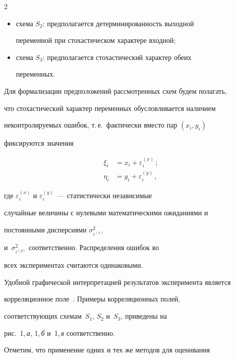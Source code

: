 \begin{multicols}{2}
\begin{itemize}
переменной при стохастическом характере выходной;

\item схема $S_2$: предполагается детерминированность выходной

переменной при стохастическом характере входной;

\item схема $S_3$: предполагается стохастический характер обеих

переменных.

\end{itemize}



  Для формализации предположений рас\-смот\-рен\-ных схем будем полагать,

что стохастический характер переменных обусловливается наличием

неконтролируемых ошибок, т.\,е.\ фактически вмес\-то пар $(x_i,y_i)$

фиксируются значения

  \begin{align}

  \xi_i&=x_i+\varepsilon_i^{(x)}\,;\label{e1-tim}\\

  \eta_i&= y_i+\varepsilon_i^{(y)}\,,\label{e2-tim}

  \end{align}

где $\varepsilon_i^{(x)}$ и $\varepsilon_i^{(y)}$~--- статистически независимые

случайные величины с нулевыми математическими ожиданиями и

постоянными дисперсиями $\sigma^2_{\varepsilon^{(x)}}$

и~$\sigma^2_{\varepsilon^{(y)}}$ соответственно. Распределения ошибок во

всех экспериментах считаются одинаковыми.



  Удобной графической интерпретацией результатов эксперимента является

корреляционное поле~\cite{6-tim}. Примеры корреляционных полей,

соответствующих схемам~$S_1$, $S_2$ и~$S_3$, приведены на

рис.~1,\,\textit{а}, 1,\,\textit{б} и~1,\,\textit{в} соответственно.



  



  Отметим, что применение одних и тех же методов для оценивания


\end{multicols}
